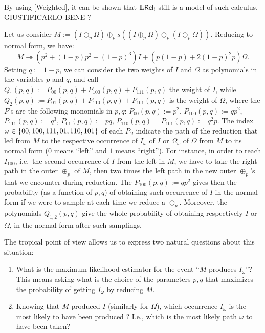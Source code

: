\begin{remark}
{\color{red}By using [Weighted], it can be shown that $\mathbb{L} \mathsf{Rel}_!$ still is a model of such calculus. GIUSTIFICARLO BENE ?}
\end{remark}

Let us consider $M:=(I\oplus_p\Omega)\oplus_ps((I\oplus_p\Omega)\oplus_p(I\oplus_p\Omega))$.
Reducing to normal form, we have:
\[
 M\twoheadrightarrow (p^2+(1-p)p^2+(1-p)^3)I+(p(1-p)+2(1-p)^2p)\Omega.
\]
Setting $q:=1-p$, we can consider the two weights of $I$ and $\Omega$ as polynomials in the variables $p$ and $q$, and call
$Q_1(p,q):=P_{00}(p,q)+P_{100}(p,q)+P_{111}(p,q)$ the weight of $I$, while
$Q_2(p,q):=P_{01}(p,q)+P_{110}(p,q)+P_{101}(p,q)$ is the weight of $\Omega$,
where the $P$'s are the following monomials in $p,q$:
$P_{00}(p,q):=p^2$,
$P_{100}(p,q):=qp^2$,
$P_{111}(p,q):=q^3$,
$P_{01}(p,q):=pq$,
$P_{110}(p,q)=P_{101}(p,q):=q^2p$.
The index $\omega\in\{00,100,111,01,110,101\}$ of each $P_\omega$ indicate the path of the reduction that led from $M$ to the respective occurrence of $I_\omega$ of $I$ or $\Omega_\omega$ of $\Omega$ from $M$ to its normal form ($0$ means ``left'' and $1$ means ``right'').
For instance, in order to reach $I_{100}$, i.e.\ the second occurrence of $I$ from the left in $M$, we have to take the right path in the outer $\oplus_p$ of $M$, then two times the left path in the new outer $\oplus_p$'s that we encounter during reduction.
The $P_{100}(p,q):=qp^2$ gives then the probability (as a function of $p,q$) of obtaining such occurrence of $I$ in the normal form if we were to sample at each time we reduce a $\oplus_p$.
Moreover, the polynomials $Q_{1,2}(p,q)$ give the whole probability of obtaining respectively $I$ or $\Omega$, in the normal form after such samplings.

The tropical point of view allows us to express two natural questions about this situation:
\begin{enumerate}
 \item What is the maximum likelihood estimator for the event ``$M$ produces $I_\omega$''?
This means asking what is the choice of the parameters $p,q$ that maximizes the probability of getting $I_\omega$ by reducing $M$.
 \item Knowing that $M$ produced $I$ (similarly for $\Omega$), which occurrence $I_\omega$ is the most likely to have been produced ? I.e., which is the most likely path $\omega$ to have been taken?
\end{enumerate}



